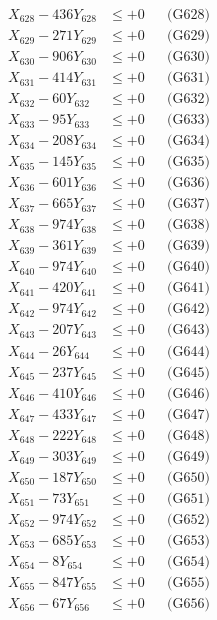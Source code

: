 \documentclass[a4paper,10pt]{article}
\begin{document}
{\begin{align}
X_{628} - 436Y_{628} &\leq +0 && \text{(G628)} \\
X_{629} - 271Y_{629} &\leq +0 && \text{(G629)} \\
X_{630} - 906Y_{630} &\leq +0 && \text{(G630)} \\
\allowbreak
X_{631} - 414Y_{631} &\leq +0 && \text{(G631)} \\
X_{632} - 60Y_{632} &\leq +0 && \text{(G632)} \\
X_{633} - 95Y_{633} &\leq +0 && \text{(G633)} \\
X_{634} - 208Y_{634} &\leq +0 && \text{(G634)} \\
X_{635} - 145Y_{635} &\leq +0 && \text{(G635)} \\
X_{636} - 601Y_{636} &\leq +0 && \text{(G636)} \\
X_{637} - 665Y_{637} &\leq +0 && \text{(G637)} \\
X_{638} - 974Y_{638} &\leq +0 && \text{(G638)} \\
X_{639} - 361Y_{639} &\leq +0 && \text{(G639)} \\
X_{640} - 974Y_{640} &\leq +0 && \text{(G640)} \\
\allowbreak
X_{641} - 420Y_{641} &\leq +0 && \text{(G641)} \\
X_{642} - 974Y_{642} &\leq +0 && \text{(G642)} \\
X_{643} - 207Y_{643} &\leq +0 && \text{(G643)} \\
X_{644} - 26Y_{644} &\leq +0 && \text{(G644)} \\
X_{645} - 237Y_{645} &\leq +0 && \text{(G645)} \\
X_{646} - 410Y_{646} &\leq +0 && \text{(G646)} \\
X_{647} - 433Y_{647} &\leq +0 && \text{(G647)} \\
X_{648} - 222Y_{648} &\leq +0 && \text{(G648)} \\
X_{649} - 303Y_{649} &\leq +0 && \text{(G649)} \\
X_{650} - 187Y_{650} &\leq +0 && \text{(G650)} \\
\allowbreak
X_{651} - 73Y_{651} &\leq +0 && \text{(G651)} \\
X_{652} - 974Y_{652} &\leq +0 && \text{(G652)} \\
X_{653} - 685Y_{653} &\leq +0 && \text{(G653)} \\
X_{654} - 8Y_{654} &\leq +0 && \text{(G654)} \\
X_{655} - 847Y_{655} &\leq +0 && \text{(G655)} \\
X_{656} - 67Y_{656} &\leq +0 && \text{(G656)} \\

\end{align}}
\end{document}
